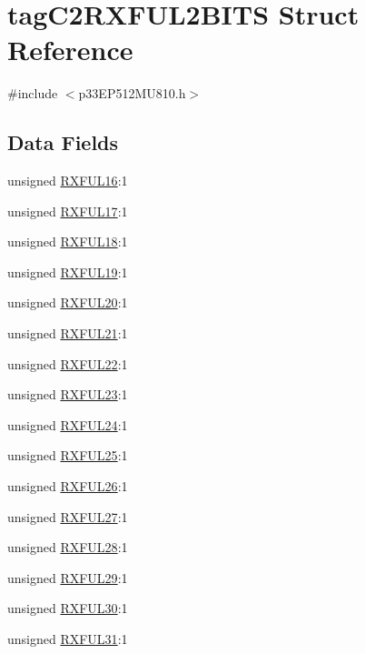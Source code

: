 \hypertarget{structtag_c2_r_x_f_u_l2_b_i_t_s}{}\section{tag\+C2\+R\+X\+F\+U\+L2\+B\+I\+TS Struct Reference}
\label{structtag_c2_r_x_f_u_l2_b_i_t_s}


{\ttfamily \#include $<$p33\+E\+P512\+M\+U810.\+h$>$}

\subsection*{Data Fields}
\begin{DoxyCompactItemize}
\item 
unsigned \hyperlink{structtag_c2_r_x_f_u_l2_b_i_t_s_a3ecae8898ac754666575fc5a93ab707b}{R\+X\+F\+U\+L16}\+:1
\item 
unsigned \hyperlink{structtag_c2_r_x_f_u_l2_b_i_t_s_a2a9627fac97e7a2cdb3cd52bb5cef34e}{R\+X\+F\+U\+L17}\+:1
\item 
unsigned \hyperlink{structtag_c2_r_x_f_u_l2_b_i_t_s_a6166c7f59b583b995e7adda4f0d454d4}{R\+X\+F\+U\+L18}\+:1
\item 
unsigned \hyperlink{structtag_c2_r_x_f_u_l2_b_i_t_s_a666949bbfaa8bf13daf17c475136f46f}{R\+X\+F\+U\+L19}\+:1
\item 
unsigned \hyperlink{structtag_c2_r_x_f_u_l2_b_i_t_s_a08caaebeb7573468fe9875a35ade5fac}{R\+X\+F\+U\+L20}\+:1
\item 
unsigned \hyperlink{structtag_c2_r_x_f_u_l2_b_i_t_s_a9c146591190d82bdc90a886ceb32289c}{R\+X\+F\+U\+L21}\+:1
\item 
unsigned \hyperlink{structtag_c2_r_x_f_u_l2_b_i_t_s_ae149578f456f5b93a0d9edb684e5b17e}{R\+X\+F\+U\+L22}\+:1
\item 
unsigned \hyperlink{structtag_c2_r_x_f_u_l2_b_i_t_s_a807892ec44f2b14b21aeec63dbe6b837}{R\+X\+F\+U\+L23}\+:1
\item 
unsigned \hyperlink{structtag_c2_r_x_f_u_l2_b_i_t_s_af17969a1bda015e397611fc69f34770d}{R\+X\+F\+U\+L24}\+:1
\item 
unsigned \hyperlink{structtag_c2_r_x_f_u_l2_b_i_t_s_a9f960ac49536b958b6ba9b8e94ed11a2}{R\+X\+F\+U\+L25}\+:1
\item 
unsigned \hyperlink{structtag_c2_r_x_f_u_l2_b_i_t_s_aa637121874b4eacb95a971fcd6f4b614}{R\+X\+F\+U\+L26}\+:1
\item 
unsigned \hyperlink{structtag_c2_r_x_f_u_l2_b_i_t_s_ad3c599b3dab4b668d945102c3cd50af9}{R\+X\+F\+U\+L27}\+:1
\item 
unsigned \hyperlink{structtag_c2_r_x_f_u_l2_b_i_t_s_abfea9cdb7a2c96693d2baa84de1dc3c2}{R\+X\+F\+U\+L28}\+:1
\item 
unsigned \hyperlink{structtag_c2_r_x_f_u_l2_b_i_t_s_a3412164598cd07d1e5eea0e94c1ce90d}{R\+X\+F\+U\+L29}\+:1
\item 
unsigned \hyperlink{structtag_c2_r_x_f_u_l2_b_i_t_s_a200970d0da6966ba73951ae71b4fa9c5}{R\+X\+F\+U\+L30}\+:1
\item 
unsigned \hyperlink{structtag_c2_r_x_f_u_l2_b_i_t_s_a328036358bb63073c684195e6b9f65db}{R\+X\+F\+U\+L31}\+:1
\end{DoxyCompactItemize}


